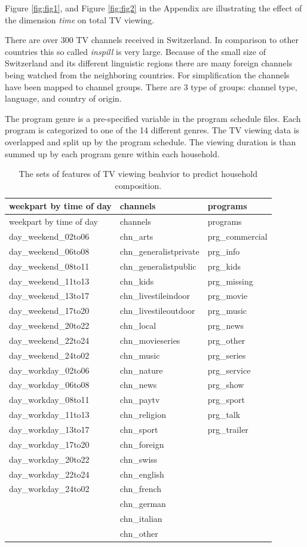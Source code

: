\documentclass[]{article}
\begin{document}
Figure \ref{fig:fig1}, and Figure \ref{fig:fig2} in the Appendix are
illustrating the effect of the dimension \emph{time} on total TV
viewing.

There are over 300 TV channels received in Switzerland. In comparison to
other countries this so called \emph{inspill} is very large. Because of
the small size of Switzerland and its different linguistic regions there
are many foreign channels being watched from the neighboring countries.
For simplification the channels have been mapped to channel groups.
There are 3 type of groups: channel type, language, and country of
origin.

The program genre is a pre-specified variable in the program schedule
files. Each program is categorized to one of the 14 different genres.
The TV viewing data is overlapped and split up by the program schedule.
The viewing duration is than summed up by each program genre within each
household.

\begin{longtable}[]{@{}lll@{}}
\caption{The sets of features of TV viewing beahvior to predict
household composition.}\tabularnewline
\toprule
weekpart by time of day & channels & programs\tabularnewline
\midrule
\endfirsthead
\toprule
weekpart by time of day & channels & programs\tabularnewline
\midrule
\endhead
day\_weekend\_02to06 & chn\_arts & prg\_commercial\tabularnewline
day\_weekend\_06to08 & chn\_generalistprivate & prg\_info\tabularnewline
day\_weekend\_08to11 & chn\_generalistpublic & prg\_kids\tabularnewline
day\_weekend\_11to13 & chn\_kids & prg\_missing\tabularnewline
day\_weekend\_13to17 & chn\_livestileindoor & prg\_movie\tabularnewline
day\_weekend\_17to20 & chn\_livestileoutdoor & prg\_music\tabularnewline
day\_weekend\_20to22 & chn\_local & prg\_news\tabularnewline
day\_weekend\_22to24 & chn\_movieseries & prg\_other\tabularnewline
day\_weekend\_24to02 & chn\_music & prg\_series\tabularnewline
day\_workday\_02to06 & chn\_nature & prg\_service\tabularnewline
day\_workday\_06to08 & chn\_news & prg\_show\tabularnewline
day\_workday\_08to11 & chn\_paytv & prg\_sport\tabularnewline
day\_workday\_11to13 & chn\_religion & prg\_talk\tabularnewline
day\_workday\_13to17 & chn\_sport & prg\_trailer\tabularnewline
day\_workday\_17to20 & chn\_foreign &\tabularnewline
day\_workday\_20to22 & chn\_swiss &\tabularnewline
day\_workday\_22to24 & chn\_english &\tabularnewline
day\_workday\_24to02 & chn\_french &\tabularnewline
& chn\_german &\tabularnewline
& chn\_italian &\tabularnewline
& chn\_other &\tabularnewline
\bottomrule
\end{longtable}
\end{document}
